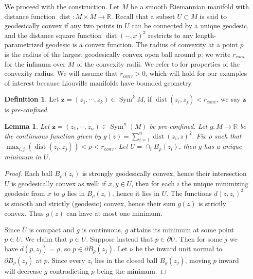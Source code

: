 \documentclass{article}
\def\R{\mathbb{R}}
\def\C{\mathbb{C}}
\DeclareMathOperator{\Sym}{Sym}
\DeclareMathOperator{\dist}{dist}
\def\bz{\mathbf{z}} %
\newtheorem{lemma}[theorem]{Lemma}
\theoremstyle{definition}
\newtheorem{definition}
[theorem]{Definition}
\begin{document}
We proceed with the construction. 
Let $M$ be a smooth Riemannian manifold with distance function $\dist: M \times M \to \R$.  Recall that a subset $U \subset M$ is said to geodesically convex if any two points in $U$ can be connected by a unique geodesic, and the distance square function $\dist(-,x)^2$ restricts to any length-parametrized geodesic is a convex function.
The radius of convexity at a point $p$ is the radius of the largest geodesically  convex open ball around $p$; we write  $r_{conv}$ for the infimum over $M$ of the convexity radii. We refer to \cite[Ch 5.4]{petersen2006riemannian} for properties of the convexity radius.  We will  assume that $r_{conv}> 0$, which will hold for our examples of interest because Liouville manifolds have bounded geometry.   

\begin{definition}
    Let $\bz=(z_1, \cdots, z_k) \in \Sym^k M$, if $\dist(z_i, z_j) < r_{conv}$, we say $\bz$ is {\em pre-confined}. 
\end{definition}

\begin{lemma}\label{lm:center}
    Let $\bz=(z_1, \cdots, z_n) \in \Sym^n(M)$ be pre-confined. Let $g: M \to \R$ be the continuous function given by
    $ g(z) = \sum_{i=1}^n \dist(z_i, z)^2. $
    Fix $\rho$ such that $\max_{i,j}(\dist(z_i,z_j)) < \rho < r_{conv}$. 
    Let $U = \cap_i B_{\rho}(z_i)$, then $g$ has a unique minimum in $U$. 
\end{lemma}
\begin{proof}
Each ball $B_\rho(z_i)$ is strongly geodesically convex, hence their
intersection $U$ is geodesically convex as well: if $x,y\in U$, then for each
$i$ the unique minimizing geodesic from $x$ to $y$ lies in $B_\rho(z_i)$, hence
it lies in $U$. The functions $d(z,z_i)^2$ is smooth and strictly (geodesic) convex, hence their sum $g(z)$ is strictly convex. Thus $g(z)$ can have at most one minimum. 

Since $\overline U$ is compact and $g$ is continuous, $g$ attains its minimum
at some point \(p\in \overline U\). We claim that \(p\in U\). Suppose instead that \(p\in \partial U\). Then for
some \(j\) we have \(d(p,z_j)=\rho\), so \(p\in \partial B_\rho(z_j)\). Let
\(\nu\) be the inward unit normal to \(\partial B_\rho(z_j)\) at \(p\). Since
every \(z_i\) lies in the closed ball \( \overline{B_\rho(z_j)}\),  moving $p$ inward will decrease $g$ contradicting $p$ being the minimum. 
\end{proof}
\end{document}
